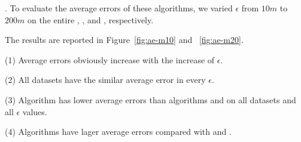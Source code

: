 .
To evaluate the average errors of these algorithms, we varied $\epsilon$ from $10m$ to $200m$ on the entire \truck, \sercar, \geolife and \pricar, respectively.

The results are reported in Figure~\ref{fig:ae-m10} and ~\ref{fig:ae-m20}.

\ni(1) Average errors obviously increase with the increase of $\epsilon$.

\ni(2) All datasets have the similar average \sed error in every $\epsilon$.

\ni(3) Algorithm \squishe has lower average errors than algorithms \dpa and \cist on all datasets and all $\epsilon$ values.

\ni(4) Algorithms \cist have lager average errors compared with \dpa and \squishe.








